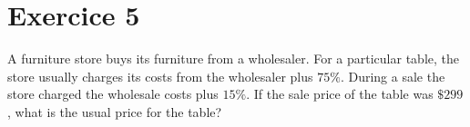 \documentclass[10pt,a4paper]{article}
\begin{document}
\section{Exercice 5}
A furniture store buys its furniture from a wholesaler. For a particular table, the store usually charges its costs from the wholesaler plus $75\%$. During a sale the store charged the wholesale costs plus $15\%$. If the sale price of the table was $\$299$, what is the usual price for the table?
\end{document}
